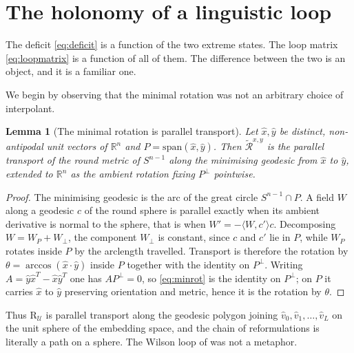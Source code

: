 \documentclass{article}
\theoremstyle{plain}
\newtheorem{lemma}[theorem]{Lemma}
\theoremstyle{definition}
\numberwithin{equation}{section}
\newcommand{\R}{\mathbb{R}}
\newcommand{\Rmin}{\widetilde{\mathcal{R}}}
\newcommand{\Uc}{\mathcal{U}}
\begin{document}
\section{The holonomy of a linguistic loop}\label{sec:holonomy}

The deficit \eqref{eq:deficit} is a function of the two extreme states.
The loop matrix \eqref{eq:loopmatrix} is a function of all of them. The
difference between the two is an object, and it is a familiar one.

We begin by observing that the minimal rotation was not an arbitrary
choice of interpolant.

\begin{lemma}[The minimal rotation is parallel transport]\label{lem:transport}
Let $\hat{x},\hat{y}$ be distinct, non-antipodal unit vectors of $\R^n$
and $P = \mathrm{span}(\hat{x},\hat{y})$. Then $\Rmin^{x,y}$ is the
parallel transport of the round metric of $S^{n-1}$ along the minimising
geodesic from $\hat{x}$ to $\hat{y}$, extended to $\R^n$ as the ambient
rotation fixing $P^{\perp}$ pointwise.
\end{lemma}

\begin{proof}
The minimising geodesic is the arc of the great circle $S^{n-1}\cap P$.
A field $W$ along a geodesic $c$ of the round sphere is parallel exactly
when its ambient derivative is normal to the sphere, that is when
$W' = -\langle W, c'\rangle c$. Decomposing $W = W_P + W_{\perp}$, the
component $W_\perp$ is constant, since $c$ and $c'$ lie in $P$, while
$W_P$ rotates inside $P$ by the arclength travelled. Transport is
therefore the rotation by $\theta = \arccos(\hat{x}\cdot\hat{y})$ inside
$P$ together with the identity on $P^\perp$. Writing
$A = \hat{y}\hat{x}^T - \hat{x}\hat{y}^T$ one has $A P^\perp = 0$, so
\eqref{eq:minrot} is the identity on $P^\perp$; on $P$ it carries
$\hat{x}$ to $\hat{y}$ preserving orientation and metric, hence it is
the rotation by $\theta$.
\end{proof}

Thus $\mathrm{R}_\Uc$ is parallel transport along the geodesic polygon
joining $\hat{v}_0, \hat{v}_1, \dots, \hat{v}_L$ on the unit sphere of
the embedding space, and the chain of reformulations is literally a path
on a sphere. The Wilson loop of \cite{CM25} was not a metaphor.
\end{document}
